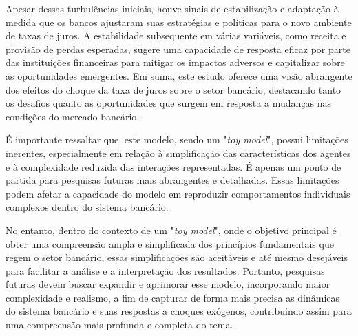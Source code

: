 \documentclass[hidelinks, article,12pt,oneside,a4paper,english,brazil,sumario=tradicional]{abntex2}
\begin{document}
Apesar dessas turbulências iniciais, houve sinais de estabilização e adaptação à medida que os bancos ajustaram suas estratégias e políticas para o novo ambiente de taxas de juros. A estabilidade subsequente em várias variáveis, como receita e provisão de perdas esperadas, sugere uma capacidade de resposta eficaz por parte das instituições financeiras para mitigar os impactos adversos e capitalizar sobre as oportunidades emergentes. Em suma, este estudo oferece uma visão abrangente dos efeitos do choque da taxa de juros sobre o setor bancário, destacando tanto os desafios quanto as oportunidades que surgem em resposta a mudanças nas condições do mercado bancário. 

É importante ressaltar que, este modelo, sendo um "\textit{toy model}", possui limitações inerentes, especialmente em relação à simplificação das características dos agentes e à complexidade reduzida das interações representadas. É apenas um ponto de partida para pesquisas futuras mais abrangentes e detalhadas. Essas limitações podem afetar a capacidade do modelo em reproduzir comportamentos individuais complexos dentro do sistema bancário.

No entanto, dentro do contexto de um "\textit{toy model}", onde o objetivo principal é obter uma compreensão ampla e simplificada dos princípios fundamentais que regem o setor bancário, essas simplificações são aceitáveis e até mesmo desejáveis para facilitar a análise e a interpretação dos resultados. Portanto, pesquisas futuras devem buscar expandir e aprimorar esse modelo, incorporando maior complexidade e realismo, a fim de capturar de forma mais precisa as dinâmicas do sistema bancário e suas respostas a choques exógenos, contribuindo assim para uma compreensão mais profunda e completa do tema.



\renewcommand{\bibsection}{\section*{REFER\^ENCIAS BIBLIOGR\'AFICAS}}


\end{document}
